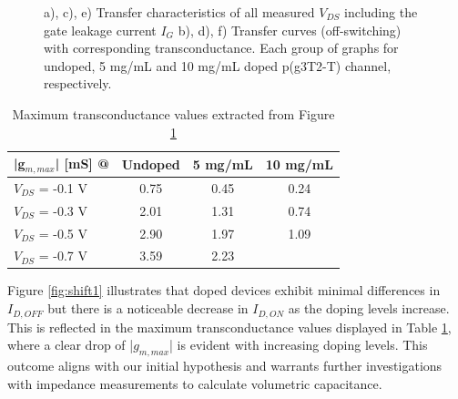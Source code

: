 \begin{figure}[!htb]
    \caption[Transfer characteristics and transconductance at different doping levels and $V_{DS}$]{a), c), e) Transfer characteristics of all measured $V_{DS}$ including the gate leakage current $I_{G}$ b), d), f) Transfer curves (off-switching) with corresponding transconductance. Each group of graphs for undoped, 5 mg/mL and 10 mg/mL doped p(g3T2-T) channel, respectively.}
    \label{fig:transx2}
\end{figure}

\begin{table}[ht]
\centering
\caption{Maximum transconductance values extracted from Figure \ref{fig:transx2}}
\begin{tabular}{l|c|c|c}
|g$_{m,max}$| [mS] @ & Undoped & 5 mg/mL & 10 mg/mL \\\hline
$V_{DS}$ = -0.1 V & 0.75 & 0.45 & 0.24\\
$V_{DS}$ = -0.3 V & 2.01 & 1.31 & 0.74\\
$V_{DS}$ = -0.5 V & 2.90 & 1.97 & 1.09\\
$V_{DS}$ = -0.7 V & 3.59 & 2.23 & \\ \hline
\end{tabular}
\label{tab:trans}
\end{table}

Figure \ref{fig:shift1} illustrates that doped devices exhibit minimal differences in $I_{D,OFF}$ but  there is a noticeable decrease in $I_{D,ON}$ as the doping levels increase. This is reflected in the maximum transconductance values displayed in Table \ref{tab:trans}, where a clear drop of |$g_{m,max}$| is evident with increasing doping levels. This outcome aligns with our initial hypothesis and warrants further investigations with impedance measurements to calculate volumetric capacitance. %

